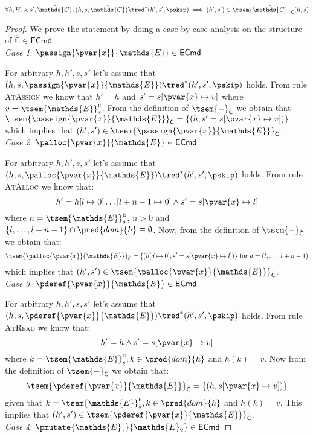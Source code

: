 \begin{lem}
	\label{lem:atomViewsE}
	\begin{gather*}
		\forall h, h', s, s', \hat{\mathds{C}} \ldotp
		(h, s, \hat{\mathds{C}}) \tred^* (h', s', \pskip)
		\implies
		(h', s') \in \tsem{\hat{\mathds{C}}}_{\hat{\mathsf{C}}}(h, s)
	\end{gather*}
	{\parindent0pt
	\begin{proof}
	We prove the statement by doing a case-by-case analysis on the structure of  $\hat{\mathds{C}} \in \mathsf{ECmd}$. \\
	\indline
	\textit{Case 1}: $\passign{\pvar{x}}{\mathds{E}} \in \mathsf{ECmd}$
	
	For arbitrary $h, h', s, s'$ let's assume that $(h, s, \passign{\pvar{x}}{\mathds{E}}) \tred^* (h', s', \pskip)$ holds. From rule \textsc{AtAssign} we know that $h' = h$ and $s' = s[\pvar{x} \mapsto v]$ where $v = \tsem{\mathds{E}}^\textsc{e}_s$. From the definition of $\tsem{-}_{\hat{\mathsf{C}}}$ we obtain that $\tsem{\passign{\pvar{x}}{\mathds{E}}}_{\hat{\mathsf{C}}} = \{ (h, s' = s[\pvar{x} \mapsto v]) \}$ which implies that $(h', s') \in \tsem{\passign{\pvar{x}}{\mathds{E}}}_{\hat{\mathsf{C}}}$. \\
	\indline
	\textit{Case 2}: $\palloc{\pvar{x}}{\mathds{E}} \in \mathsf{ECmd}$
	
	For arbitrary $h, h', s, s'$ let's assume that $(h, s, \palloc{\pvar{x}}{\mathds{E}}) \tred^* (h', s', \pskip)$ holds. From rule \textsc{AtAlloc} we know that:
	\[
		h' = h[l \mapsto 0]\dots[l + n - 1 \mapsto 0] \land s' = s[\pvar{x} \mapsto l]
	\]
	where $n = \tsem{\mathds{E}}^\textsc{e}_s$, $n > 0$ and $\{ l, \ldots, l + n - 1\} \cap \pred{dom}{h} \equiv \emptyset$. Now, from the definition of $\tsem{-}_{\hat{\mathsf{C}}}$ we obtain that:
	\[
		\tsem{\palloc{\pvar{x}}{\mathds{E}}}_{\hat{\mathsf{C}}} = \{ (h[\vec{a} \mapsto 0], s' = s[\pvar{x} \mapsto l]) \} \text{ for } \vec{a} = (l, \ldots, l + n - 1)
	\]
	which implies that $(h', s') \in \tsem{\palloc{\pvar{x}}{\mathds{E}}}_{\hat{\mathsf{C}}}$. \\
	\indline
	\textit{Case 3}: $\pderef{\pvar{x}}{\mathds{E}} \in \mathsf{ECmd}$
	
	For arbitrary $h, h', s, s'$ let's assume that $(h, s, \pderef{\pvar{x}}{\mathds{E}}) \tred^* (h', s', \pskip)$ holds. From rule \textsc{AtRead} we know that:
	\[
		h' = h \land s' = s[\pvar{x} \mapsto v]
	\]
	where $k = \tsem{\mathds{E}}^\textsc{e}_s, k \in \pred{dom}{h}$ and $h(k) = v$. Now from  the definition of $\tsem{-}_{\hat{\mathsf{C}}}$ we obtain that:
	\[
		\tsem{\pderef{\pvar{x}}{\mathds{E}}}_{\hat{\mathsf{C}}} = \{ (h, s[\pvar{x} \mapsto v]) \}
	\]
	given that $k = \tsem{\mathds{E}}^\textsc{e}_s, k \in \pred{dom}{h}$ and $h(k) = v$. This implies that $(h', s') \in \tsem{\pderef{\pvar{x}}{\mathds{E}}}_{\hat{\mathsf{C}}}$. \\
	\indline
	\textit{Case 4}: $\pmutate{\mathds{E}_1}{\mathds{E}_2} \in \mathsf{ECmd}$
	

\end{proof}}
\end{lem}
